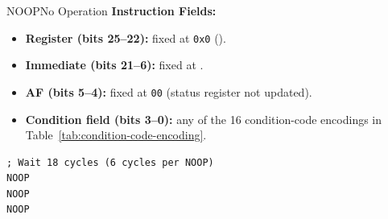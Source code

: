 \begin{instructionbox}{NOOP}{No Operation}
	\textbf{Instruction Fields:}
	\begin{itemize}
		\item \textbf{Register (bits 25--22):} fixed at \texttt{0x0} ().
		\item \textbf{Immediate (bits 21--6):} fixed at .
		\item \textbf{AF (bits 5--4):} fixed at \texttt{00} (status register not updated).
		\item \textbf{Condition field (bits 3--0):} any of the 16 condition-code encodings in
		      Table~\ref{tab:condition-code-encoding}.
	\end{itemize}

	\begin{example}
		\begin{lstlisting}
; Wait 18 cycles (6 cycles per NOOP)
NOOP
NOOP
NOOP
		\end{lstlisting}
		\caption{Timing Delay with NOOP}
	\end{example}
\end{instructionbox}
